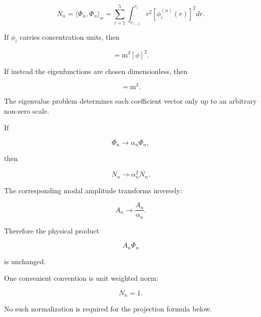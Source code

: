 \documentclass[11pt,a4paper]{article}
\begin{document}
\begin{equation}
\boxed{
N_n
=
\langle\Phi_n,\Phi_n\rangle_w
=
\sum_{i=1}^{5}
\int_{r_{i-1}}^{r_i}
r^2
\left[
\phi_i^{(n)}(r)
\right]^2
dr.
}
\tag{TRISO-ML-533}
\label{eq:triso-ml-533}
\end{equation}

If $\phi_i$ carries concentration units, then

\begin{equation}
[N_n]
=
\mathrm{m^3}
[\phi]^2.
\tag{TRISO-ML-534}
\label{eq:triso-ml-534}
\end{equation}

If instead the eigenfunctions are chosen dimensionless, then

\begin{equation}
[N_n]=\mathrm{m^3}.
\tag{TRISO-ML-535}
\label{eq:triso-ml-535}
\end{equation}

The eigenvalue problem determines each coefficient vector only up to an arbitrary non-zero scale.

If

\begin{equation}
\Phi_n\to\alpha_n\Phi_n,
\tag{TRISO-ML-536}
\label{eq:triso-ml-536}
\end{equation}

then

\begin{equation}
N_n\to\alpha_n^2N_n.
\tag{TRISO-ML-537}
\label{eq:triso-ml-537}
\end{equation}

The corresponding modal amplitude transforms inversely:

\begin{equation}
A_n\to\frac{A_n}{\alpha_n}.
\tag{TRISO-ML-538}
\label{eq:triso-ml-538}
\end{equation}

Therefore the physical product

\begin{equation}
A_n\Phi_n
\tag{TRISO-ML-539}
\label{eq:triso-ml-539}
\end{equation}

is unchanged.

One convenient convention is unit weighted norm:

\begin{equation}
N_n=1.
\tag{TRISO-ML-540}
\label{eq:triso-ml-540}
\end{equation}

No such normalization is required for the projection formula below.
\end{document}
